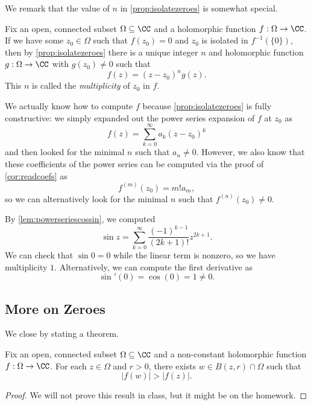 We remark that the value of $n$ in \autoref{prop:isolatezeroes} is somewhat special.
\begin{definition}[Multiplicity]
	Fix an open, connected subset $\Omega\subseteq\CC$ and a holomorphic function $f:\Omega\to\CC$. If we have some $z_0\in\Omega$ such that $f(z_0)=0$ and $z_0$ is isolated in $f^{-1}(\{0\})$, then by \autoref{prop:isolatezeroes} there is a unique integer $n$ and holomorphic function $g:\Omega\to\CC$ with $g(z_0)\ne0$ such that
	\[f(z)=(z-z_0)^ng(z).\]
	This $n$ is called the \textit{multiplicity} of $z_0$ in $f$.
\end{definition}
We actually know how to compute $f$ because \autoref{prop:isolatezeroes} is fully constructive: we simply expanded out the power series expansion of $f$ at $z_0$ as
\[f(z)=\sum_{k=0}^\infty a_k(z-z_0)^k\]
and then looked for the minimal $n$ such that $a_n\ne0$. However, we also know that these coefficients of the power series can be computed via the proof of \autoref{cor:readcoefs} as
\[f^{(m)}(z_0)=m!a_m,\]
so we can alternatively look for the minimal $n$ such that $f^{(n)}(z_0)\ne0$.
\begin{example}
	By \autoref{lem:powerseriescossin}, we computed
	\[\sin z=\sum_{k=0}^\infty\frac{(-1)^{k-1}}{(2k+1)!}z^{2k+1}.\]
	We can check that $\sin0=0$ while the linear term is nonzero, so we have multiplicity $1$. Alternatively, we can compute the first derivative as
	\[\sin'(0)=\cos(0)=1\ne0.\]
\end{example}

\subsection{More on Zeroes}
We close by stating a theorem.
\begin{theorem} \label{thm:mmp}
	Fix an open, connected subset $\Omega\subseteq\CC$ and a non-constant holomorphic function $f:\Omega\to\CC$. For each $z\in\Omega$ and $r>0$, there exists $w\in B(z,r)\cap\Omega$ such that
	\[|f(w)|>|f(z)|.\]
\end{theorem}
\begin{proof}
	We will not prove this result in class, but it might be on the homework.
\end{proof}

